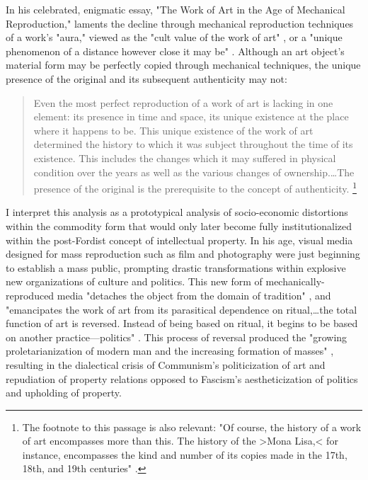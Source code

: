 In his celebrated, enigmatic essay, "The Work of Art in the Age of Mechanical Reproduction," \citeauthor{Benjamin1969-ed} laments the decline through mechanical reproduction techniques of a work's "aura," viewed as the "cult value of the work of art" \autocite[243n5]{Benjamin1969-ed}, or a "unique phenomenon of a distance however close it may be" \autocite[222]{Benjamin1969-ed}. Although an art object's material form may be perfectly copied through mechanical techniques, the unique presence of the original and its subsequent authenticity may not:
\blockquote{
  Even the most perfect reproduction of a work of art is lacking in one element: its presence in time and space, its unique existence at the place where it happens to be. This unique existence of the work of art determined the history to which it was subject throughout the time of its existence. This includes the changes which it may suffered in physical condition over the years as well as the various changes of ownership.…The presence of the original is the prerequisite to the concept of authenticity. \autocite[220]{Benjamin1969-ed}\footnote{
  The footnote to this passage is also relevant: "Of course, the history of a work of art encompasses more than this. The history of the >Mona Lisa,< for instance, encompasses the kind and number of its copies made in the 17th, 18th, and 19th centuries" \autocite[243n1]{Benjamin1969-ed}.
  }
}

I interpret this analysis as a prototypical analysis of socio-economic distortions within the commodity form that would only later become fully institutionalized within the post-Fordist concept of intellectual property. In his age, visual media designed for mass reproduction such as film and photography were just beginning to establish a mass public, prompting drastic transformations within explosive new organizations of culture and politics. This new form of mechanically-reproduced media "detaches the object from the domain of tradition" \autocite[221]{Benjamin1969-ed}, and "emancipates the work of art from its parasitical dependence on ritual,…the total function of art is reversed. Instead of being based on ritual, it begins to be based on another practice---politics" \autocite[224]{Benjamin1969-ed}. This process of reversal produced the "growing proletarianization of modern man and the increasing formation of masses" \autocite[241]{Benjamin1969-ed}, resulting in the dialectical crisis of Communism's politicization of art and repudiation of property relations opposed to Fascism's aestheticization of politics and upholding of property.

